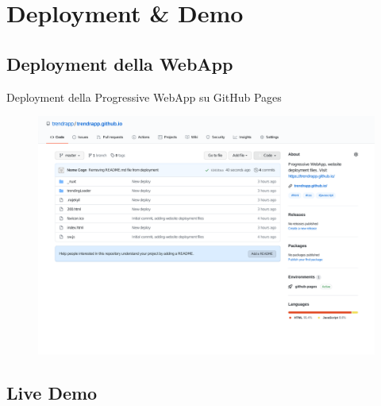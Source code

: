 \documentclass[xcolor=svgnames, aspectratio=169]{beamer}
\begin{document}

\section{Deployment \& Demo}

\begin{frame}{\secname}
    \tableofcontents[sections={\thesection}, subsubsectionstyle=show, sectionstyle=hide]
\end{frame}


\subsection{Deployment della WebApp}

\begin{frame}{Deployment della Progressive WebApp su GitHub Pages}
    \vspace*{-6pt}
    \begin{figure}[H]
        \centering
            \includegraphics[width=0.75\paperwidth,height=0.75\paperheight,keepaspectratio]{trendrapp.github.io.pdf}
    \end{figure}
\end{frame}


\subsection{Live Demo}
\end{document}
